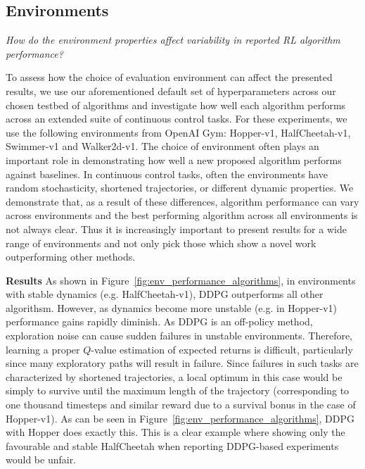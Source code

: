 \documentclass[letterpaper]{article} %
\begin{document}
\subsection{Environments}
\textit{How do the environment properties affect variability in reported RL algorithm performance?}
\medskip

\noindent To assess how the choice of evaluation environment can affect the presented results, we use our aforementioned default set of hyperparameters across our chosen testbed of algorithms and investigate how well each algorithm performs across an extended suite of continuous control tasks. For these experiments, we use the following environments from OpenAI Gym: Hopper-v1, HalfCheetah-v1, Swimmer-v1 and Walker2d-v1. The choice of environment often plays an important role in demonstrating how well a new proposed algorithm performs against baselines. In continuous control tasks, often the environments have random stochasticity, shortened trajectories, or different dynamic properties. We demonstrate that, as a result of these differences, algorithm performance can vary across environments and the best performing algorithm across all environments is not always clear. Thus it is increasingly important to present results for a wide range of environments and not only pick those which show a novel work outperforming other methods.

\textbf{Results} As shown in Figure~\ref{fig:env_performance_algorithms}, in environments with stable dynamics (e.g. HalfCheetah-v1), DDPG outperforms all other algorithsm. However, as dynamics become more unstable (e.g. in Hopper-v1) performance gains rapidly diminish. As DDPG is an off-policy method, exploration noise can cause sudden failures in unstable environments. Therefore, learning a proper $Q$-value estimation of expected returns is difficult, particularly since many exploratory paths will result in failure. Since failures in such tasks are characterized by shortened trajectories, a local optimum in this case would be simply to survive until the maximum length of the trajectory (corresponding to one thousand timesteps and similar reward due to a survival bonus in the case of Hopper-v1). As can be seen in Figure~\ref{fig:env_performance_algorithms}, DDPG with Hopper does exactly this. This is a clear example where showing only the favourable and stable HalfCheetah when reporting DDPG-based experiments would be unfair.
\end{document}
